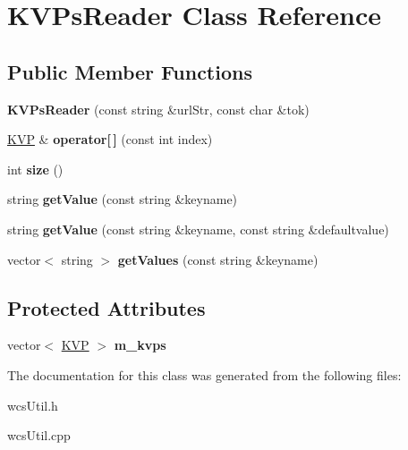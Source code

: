 \hypertarget{classKVPsReader}{
\section{KVPsReader Class Reference}
\label{classKVPsReader}
}
\subsection*{Public Member Functions}
\begin{DoxyCompactItemize}
\item 
\hypertarget{classKVPsReader_a761728641415f8debcab8952ce001832}{
{\bfseries KVPsReader} (const string \&urlStr, const char \&tok)}
\label{classKVPsReader_a761728641415f8debcab8952ce001832}

\item 
\hypertarget{classKVPsReader_a3d8944ec6b9769148bd716ea1ce53266}{
\hyperlink{classKVP}{KVP} \& {\bfseries operator\mbox{[}$\,$\mbox{]}} (const int index)}
\label{classKVPsReader_a3d8944ec6b9769148bd716ea1ce53266}

\item 
\hypertarget{classKVPsReader_a882a6c61810fce311ffdabf98be4f817}{
int {\bfseries size} ()}
\label{classKVPsReader_a882a6c61810fce311ffdabf98be4f817}

\item 
\hypertarget{classKVPsReader_a65d3870e649cb98473a564c0ca92aee0}{
string {\bfseries getValue} (const string \&keyname)}
\label{classKVPsReader_a65d3870e649cb98473a564c0ca92aee0}

\item 
\hypertarget{classKVPsReader_ae7eb8a9e45adec512620513d9cd05d7f}{
string {\bfseries getValue} (const string \&keyname, const string \&defaultvalue)}
\label{classKVPsReader_ae7eb8a9e45adec512620513d9cd05d7f}

\item 
\hypertarget{classKVPsReader_a3e9bb781a8d88bd0ac15dd1f88329dba}{
vector$<$ string $>$ {\bfseries getValues} (const string \&keyname)}
\label{classKVPsReader_a3e9bb781a8d88bd0ac15dd1f88329dba}

\end{DoxyCompactItemize}
\subsection*{Protected Attributes}
\begin{DoxyCompactItemize}
\item 
\hypertarget{classKVPsReader_aa1500de3a6435e175d469838b44a6ce5}{
vector$<$ \hyperlink{classKVP}{KVP} $>$ {\bfseries m\_\-kvps}}
\label{classKVPsReader_aa1500de3a6435e175d469838b44a6ce5}

\end{DoxyCompactItemize}


The documentation for this class was generated from the following files:\begin{DoxyCompactItemize}
\item 
wcsUtil.h\item 
wcsUtil.cpp\end{DoxyCompactItemize}
